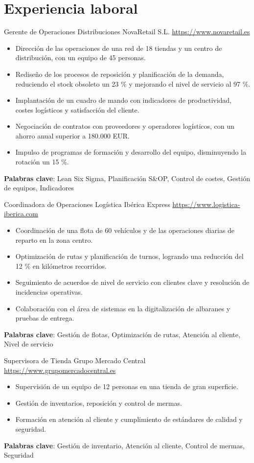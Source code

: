 \documentclass[a4paper, serif, 10pt]{moderncv}
\begin{document}
\section{Experiencia laboral}

        {Gerente de Operaciones}
        {Distribuciones NovaRetail S.L.}
        {\url{https://www.novaretail.es}}
        {}
        {\begin{itemize}
\item Dirección de las operaciones de una red de 18 tiendas y un centro de distribución, con un equipo de 45 personas.
\item Rediseño de los procesos de reposición y planificación de la demanda, reduciendo el stock obsoleto un 23 \% y mejorando el nivel de servicio al 97 \%.
\item Implantación de un cuadro de mando con indicadores de productividad, costes logísticos y satisfacción del cliente.
\item Negociación de contratos con proveedores y operadores logísticos, con un ahorro anual superior a 180.000 EUR.
\item Impulso de programas de formación y desarrollo del equipo, disminuyendo la rotación un 15 \%.
\end{itemize}
\textbf{Palabras clave}: Lean Six Sigma, Planificación S\&OP, Control de costes, Gestión de equipos, Indicadores}

        {Coordinadora de Operaciones}
        {Logística Ibérica Express}
        {\url{https://www.logistica-iberica.com}}
        {}
        {\begin{itemize}
\item Coordinación de una flota de 60 vehículos y de las operaciones diarias de reparto en la zona centro.
\item Optimización de rutas y planificación de turnos, logrando una reducción del 12 \% en kilómetros recorridos.
\item Seguimiento de acuerdos de nivel de servicio con clientes clave y resolución de incidencias operativas.
\item Colaboración con el área de sistemas en la digitalización de albaranes y pruebas de entrega.
\end{itemize}
\textbf{Palabras clave}: Gestión de flotas, Optimización de rutas, Atención al cliente, Nivel de servicio}

        {Supervisora de Tienda}
        {Grupo Mercado Central}
        {\url{https://www.grupomercadocentral.es}}
        {}
        {\begin{itemize}
\item Supervisión de un equipo de 12 personas en una tienda de gran superficie.
\item Gestión de inventarios, reposición y control de mermas.
\item Formación en atención al cliente y cumplimiento de estándares de calidad y seguridad.
\end{itemize}
\textbf{Palabras clave}: Gestión de inventario, Atención al cliente, Control de mermas, Seguridad}
\end{document}
